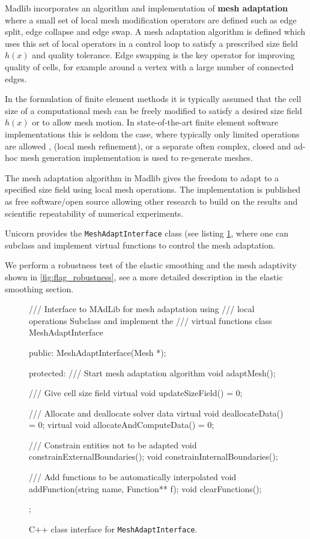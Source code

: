 Madlib incorporates an algorithm and implementation of {\bf mesh
adaptation} where a small set of local mesh modification operators are
defined such as edge split, edge collapse and edge swap. A mesh
adaptation algorithm is defined which uses this set of local operators
in a control loop to satisfy a prescribed size field $h(x)$ and
quality tolerance. Edge swapping is the key operator for improving
quality of cells, for example around a vertex with a large number of
connected edges.

In the formulation of finite element methods it is typically assumed
that the cell size of a computational mesh can be freely modified to
satisfy a desired size field $h(x)$ or to allow mesh motion. In
state-of-the-art finite element software implementations this is
seldom the case, where typically only limited operations are allowed
\citep{BangerthHartmannKanschat2007, COMSOL2009}, (local mesh refinement),
or a separate often complex, closed and ad-hoc mesh generation
implementation is used to re-generate meshes.

The mesh adaptation algorithm in Madlib gives the freedom to adapt to
a specified size field using local mesh operations. The implementation
is published as free software/open source allowing other research to
build on the results and scientific repeatability of numerical
experiments.

Unicorn provides the {\tt MeshAdaptInterface} class (see
listing \ref{code:MeshAdaptInterface}, where one can subclass and
implement virtual functions to control the mesh adaptation.

We perform a robustness test of the elastic smoothing and the mesh
adaptivity shown in \ref{fig:flag_robustness}, see a more detailed
description in the elastic smoothing section.

\begin{figure}[!h]
\begin{c++}
/// Interface to MAdLib for mesh adaptation using
/// local operations Subclass and implement the
/// virtual functions
class MeshAdaptInterface
{
public:
  MeshAdaptInterface(Mesh *);

protected:
  /// Start mesh adaptation algorithm
  void adaptMesh();

  /// Give cell size field
  virtual void updateSizeField() = 0;

  /// Allocate and deallocate solver data
  virtual void deallocateData() = 0;
  virtual void allocateAndComputeData() = 0;

  /// Constrain entities not to be adapted
  void constrainExternalBoundaries();
  void constrainInternalBoundaries();

  /// Add functions to be automatically interpolated
  void addFunction(string name, Function** f);
  void clearFunctions();
};
\end{c++}
\caption{
C++ class interface for {\tt MeshAdaptInterface}.
}
\label{code:MeshAdaptInterface}
\end{figure}



